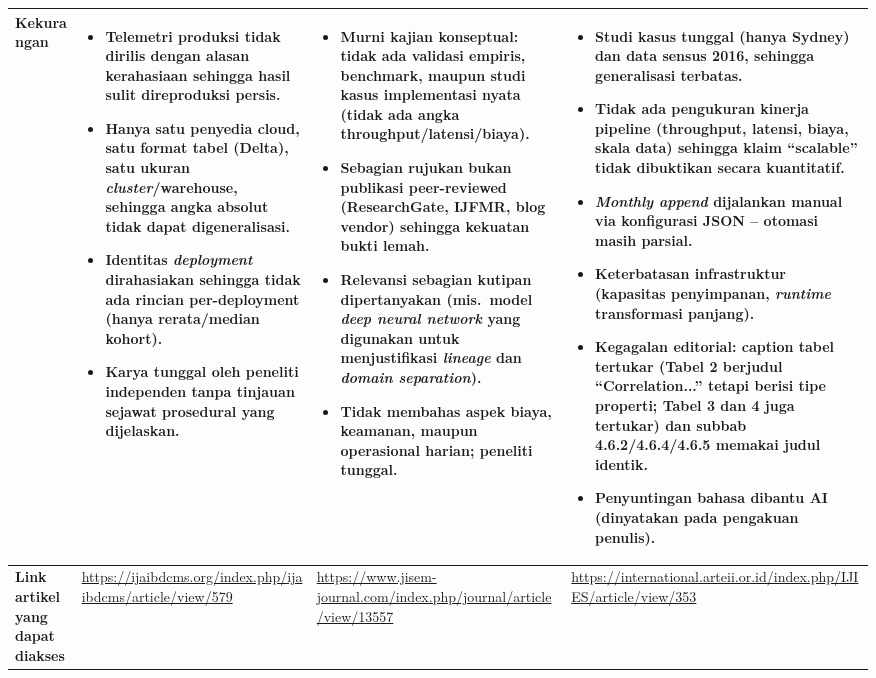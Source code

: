 \documentclass[11pt,a4paper]{article}
\newenvironment{cellitems}
  {\vspace{-2pt}\begin{itemize}\setlength{\itemsep}{1.5pt}\setlength{\parskip}{0pt}\setlength{\topsep}{1pt}}
  {\end{itemize}\vspace{-2pt}}
\begin{document}
\begin{longtable}{|L{2.5cm}|L{7.65cm}|L{7.65cm}|L{7.65cm}|}
\textbf{Kekurangan} &
\begin{cellitems}
  \item Telemetri produksi tidak dirilis dengan alasan kerahasiaan sehingga hasil sulit direproduksi persis.
  \item Hanya satu penyedia cloud, satu format tabel (Delta), satu ukuran \textit{cluster}/warehouse, sehingga angka absolut tidak dapat digeneralisasi.
  \item Identitas \textit{deployment} dirahasiakan sehingga tidak ada rincian per-deployment (hanya rerata/median kohort).
  \item Karya tunggal oleh peneliti independen tanpa tinjauan sejawat prosedural yang dijelaskan.
\end{cellitems} &
\begin{cellitems}
  \item Murni kajian konseptual: tidak ada validasi empiris, benchmark, maupun studi kasus implementasi nyata (tidak ada angka throughput/latensi/biaya).
  \item Sebagian rujukan bukan publikasi peer-reviewed (ResearchGate, IJFMR, blog vendor) sehingga kekuatan bukti lemah.
  \item Relevansi sebagian kutipan dipertanyakan (mis.\ model \textit{deep neural network} yang digunakan untuk menjustifikasi \textit{lineage} dan \textit{domain separation}).
  \item Tidak membahas aspek biaya, keamanan, maupun operasional harian; peneliti tunggal.
\end{cellitems} &
\begin{cellitems}
  \item Studi kasus tunggal (hanya Sydney) dan data sensus 2016, sehingga generalisasi terbatas.
  \item Tidak ada pengukuran kinerja pipeline (throughput, latensi, biaya, skala data) sehingga klaim ``scalable'' tidak dibuktikan secara kuantitatif.
  \item \textit{Monthly append} dijalankan manual via konfigurasi JSON -- otomasi masih parsial.
  \item Keterbatasan infrastruktur (kapasitas penyimpanan, \textit{runtime} transformasi panjang).
  \item Kegagalan editorial: caption tabel tertukar (Tabel 2 berjudul ``Correlation...'' tetapi berisi tipe properti; Tabel 3 dan 4 juga tertukar) dan subbab 4.6.2/4.6.4/4.6.5 memakai judul identik.
  \item Penyuntingan bahasa dibantu AI (dinyatakan pada pengakuan penulis).
\end{cellitems} \\
\hline

\textbf{Link artikel yang dapat diakses} &
\url{https://ijaibdcms.org/index.php/ijaibdcms/article/view/579} &
\url{https://www.jisem-journal.com/index.php/journal/article/view/13557} &
\url{https://international.arteii.or.id/index.php/IJIES/article/view/353} \\
\hline

\end{longtable}
\end{document}
